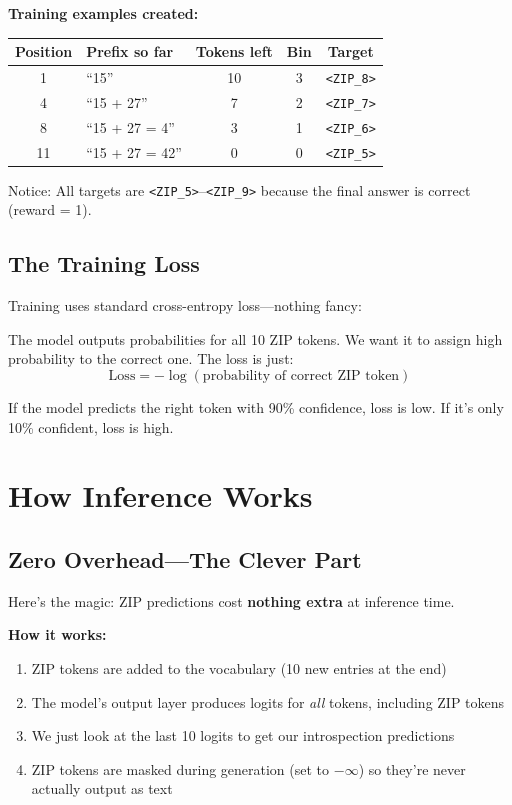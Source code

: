\documentclass[11pt,a4paper]{article}
\newcommand{\ziptoken}[1]{\texttt{<ZIP\_#1>}}
\begin{document}
\textbf{Training examples created:}

\begin{center}
\begin{tabular}{@{}clccc@{}}
\toprule
\textbf{Position} & \textbf{Prefix so far} & \textbf{Tokens left} & \textbf{Bin} & \textbf{Target} \\
\midrule
1 & ``15'' & 10 & 3 & \ziptoken{8} \\
4 & ``15 + 27'' & 7 & 2 & \ziptoken{7} \\
8 & ``15 + 27 = 4'' & 3 & 1 & \ziptoken{6} \\
11 & ``15 + 27 = 42'' & 0 & 0 & \ziptoken{5} \\
\bottomrule
\end{tabular}
\end{center}

Notice: All targets are \ziptoken{5}--\ziptoken{9} because the final answer is correct (reward = 1).

\subsection{The Training Loss}

Training uses standard cross-entropy loss---nothing fancy:

The model outputs probabilities for all 10 ZIP tokens. We want it to assign high probability to the correct one. The loss is just:
\[
\text{Loss} = -\log(\text{probability of correct ZIP token})
\]

If the model predicts the right token with 90\% confidence, loss is low. If it's only 10\% confident, loss is high.

\section{How Inference Works}

\subsection{Zero Overhead---The Clever Part}

Here's the magic: ZIP predictions cost \textbf{nothing extra} at inference time.

\textbf{How it works:}
\begin{enumerate}
    \item ZIP tokens are added to the vocabulary (10 new entries at the end)
    \item The model's output layer produces logits for \textit{all} tokens, including ZIP tokens
    \item We just look at the last 10 logits to get our introspection predictions
    \item ZIP tokens are masked during generation (set to $-\infty$) so they're never actually output as text
\end{enumerate}
\end{document}

